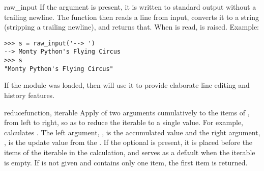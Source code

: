 \begin{funcdesc}{raw_input}{}
  If the  argument is present, it is written to standard output
  without a trailing newline.  The function then reads a line from input,
  converts it to a string (stripping a trailing newline), and returns that.
  When \EOF{} is read,  is raised. Example:

\begin{verbatim}
>>> s = raw_input('--> ')
--> Monty Python's Flying Circus
>>> s
"Monty Python's Flying Circus"
\end{verbatim}

  If the  module was loaded, then
   will use it to provide elaborate
  line editing and history features.
\end{funcdesc}

\begin{funcdesc}{reduce}{function, iterable}
  Apply  of two arguments cumulatively to the items of
  , from left to right, so as to reduce the iterable to
  a single value.  For example,  calculates .  The left argument,
  , is the accumulated value and the right argument, ,
  is the update value from the .  If the optional
   is present, it is placed before the items of the
  iterable in the calculation, and serves as a default when the
  iterable is empty.  If  is not given and
   contains only one item, the first item is returned.
\end{funcdesc}

